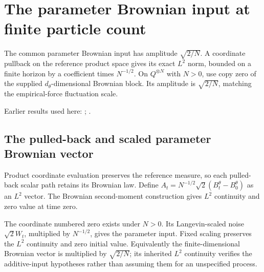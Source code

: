 \documentclass[11pt,a4paper]{report}
\begin{document}
\section{\texorpdfstring{The parameter Brownian input at finite particle count}{The parameter Brownian input at finite particle count}}
\label{proof-module-ProximalLangevin-MeanFieldNoise-lean}


The common parameter Brownian input has amplitude \(\sqrt{2/N}\). A coordinate pullback on the reference product space gives its exact \(L^2\) norm, bounded on a finite horizon by a coefficient times \(N^{-1/2}\). On \(Q^{\otimes N}\) with \(N>0\), use copy zero of the supplied \(d_\theta\)-dimensional Brownian block. Its amplitude is \(\sqrt{2/N}\), matching the empirical-force fluctuation scale.



Earlier results used here: \cite[Section~3.32]{LangevinLean2026ULASC}; \cite[Section~3.8]{LangevinLean2026ULASC}.
\subsection{\texorpdfstring{The pulled-back and scaled parameter Brownian vector}{The pulled-back and scaled parameter Brownian vector}}
\label{report-step-ProximalLangevin-MeanFieldNoise-lean-1}


Product coordinate evaluation preserves the reference measure, so each pulled-back scalar path retains its Brownian law. Define \(A_t=N^{-1/2}\sqrt2(B_t^\theta-B_0^\theta)\) as an \(L^2\) vector. The Brownian second-moment construction gives \(L^2\) continuity and zero value at time zero.



The coordinate numbered zero exists under \(N>0\). Its Langevin-scaled noise \(\sqrt2W_t\), multiplied by \(N^{-1/2}\), gives the parameter input. Fixed scaling preserves the \(L^2\) continuity and zero initial value. Equivalently the finite-dimensional Brownian vector is multiplied by \(\sqrt{2/N}\); its inherited \(L^2\) continuity verifies the additive-input hypotheses rather than assuming them for an unspecified process.
\end{document}
